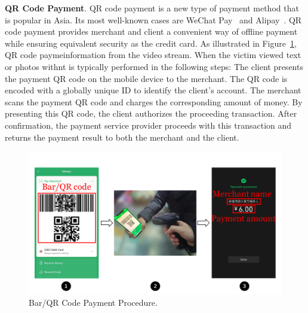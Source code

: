 \textbf{QR Code Payment}.
QR code payment is a new type of payment method that is popular in Asia. Its most well-known cases are WeChat Pay~\cite{Wechat-pay} and Alipay~\cite{AliPay}. QR code payment provides merchant and client a convenient way of offline payment while ensuring equivalent security as the credit card.
As illustrated in Figure~\ref{fig:qr_payment_procedure}, QR code paymeinformation from the video stream.  When the victim viewed text or photos withnt is typically performed in the following steps:
 The client presents the payment QR code on the mobile device to the merchant.
The QR code is encoded with a globally unique ID to identify the client's account.
 The merchant scans the payment QR code and charges the corresponding amount of money.
By presenting this QR code, the client authorizes the proceeding transaction.
 After confirmation, the payment service provider proceeds with this transaction and returns the payment result to both the merchant and the client.

\begin{figure}[t]
	\centering
	\includegraphics[width=\linewidth]{./Figs/qr_code_payment.png}
	\caption{Bar/QR Code Payment Procedure.}
	\label{fig:qr_payment_procedure}
\end{figure}


